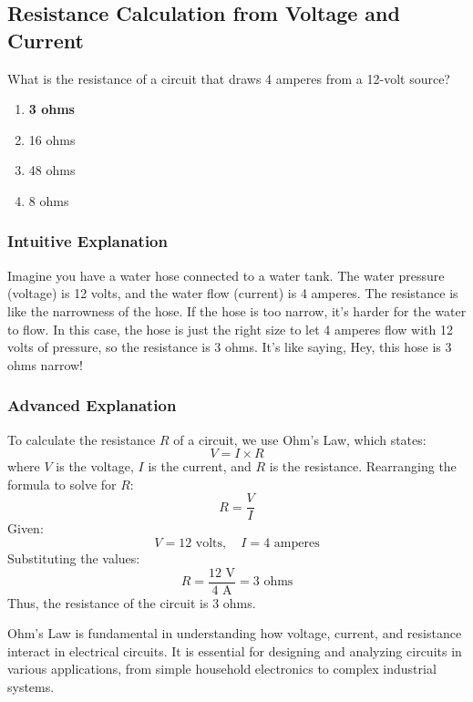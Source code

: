 \subsection{Resistance Calculation from Voltage and Current}
\label{T5D06}

\begin{tcolorbox}[colback=gray!10!white,colframe=black!75!black,title=T5D06]
What is the resistance of a circuit that draws 4 amperes from a 12-volt source?
\begin{enumerate}[label=\Alph*)]
    \item \textbf{3 ohms}
    \item 16 ohms
    \item 48 ohms
    \item 8 ohms
\end{enumerate}
\end{tcolorbox}

\subsubsection{Intuitive Explanation}
Imagine you have a water hose connected to a water tank. The water pressure (voltage) is 12 volts, and the water flow (current) is 4 amperes. The resistance is like the narrowness of the hose. If the hose is too narrow, it’s harder for the water to flow. In this case, the hose is just the right size to let 4 amperes flow with 12 volts of pressure, so the resistance is 3 ohms. It’s like saying, Hey, this hose is 3 ohms narrow!

\subsubsection{Advanced Explanation}
To calculate the resistance \( R \) of a circuit, we use Ohm's Law, which states:
\[
V = I \times R
\]
where \( V \) is the voltage, \( I \) is the current, and \( R \) is the resistance. Rearranging the formula to solve for \( R \):
\[
R = \frac{V}{I}
\]
Given:
\[
V = 12 \text{ volts}, \quad I = 4 \text{ amperes}
\]
Substituting the values:
\[
R = \frac{12 \text{ V}}{4 \text{ A}} = 3 \text{ ohms}
\]
Thus, the resistance of the circuit is 3 ohms.

Ohm's Law is fundamental in understanding how voltage, current, and resistance interact in electrical circuits. It is essential for designing and analyzing circuits in various applications, from simple household electronics to complex industrial systems.

